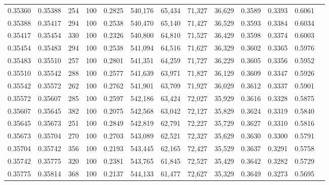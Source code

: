 \begin{tabular}{rrrrrrrrrrrrr}
0.35360 & 0.35388 &   254 & 100 &                                     0.2825 & 540,176 &  65,434 &  71,327 &  36,629 & 0.3589 & 0.3393 & 0.6061 \\
0.35388 & 0.35417 &   294 & 100 &                                     0.2538 & 540,470 &  65,140 &  71,427 &  36,529 & 0.3593 & 0.3384 & 0.6034 \\
0.35417 & 0.35454 &   330 & 100 &                                     0.2326 & 540,800 &  64,810 &  71,527 &  36,429 & 0.3598 & 0.3374 & 0.6003 \\
0.35454 & 0.35483 &   294 & 100 &                                     0.2538 & 541,094 &  64,516 &  71,627 &  36,329 & 0.3602 & 0.3365 & 0.5976 \\
0.35483 & 0.35510 &   257 & 100 &                                     0.2801 & 541,351 &  64,259 &  71,727 &  36,229 & 0.3605 & 0.3356 & 0.5952 \\
0.35510 & 0.35542 &   288 & 100 &                                     0.2577 & 541,639 &  63,971 &  71,827 &  36,129 & 0.3609 & 0.3347 & 0.5926 \\
0.35542 & 0.35572 &   262 & 100 &                                     0.2762 & 541,901 &  63,709 &  71,927 &  36,029 & 0.3612 & 0.3337 & 0.5901 \\
0.35572 & 0.35607 &   285 & 100 &                                     0.2597 & 542,186 &  63,424 &  72,027 &  35,929 & 0.3616 & 0.3328 & 0.5875 \\
0.35607 & 0.35645 &   382 & 100 &                                     0.2075 & 542,568 &  63,042 &  72,127 &  35,829 & 0.3624 & 0.3319 & 0.5840 \\
0.35645 & 0.35673 &   251 & 100 &                                     0.2849 & 542,819 &  62,791 &  72,227 &  35,729 & 0.3627 & 0.3310 & 0.5816 \\
0.35673 & 0.35704 &   270 & 100 &                                     0.2703 & 543,089 &  62,521 &  72,327 &  35,629 & 0.3630 & 0.3300 & 0.5791 \\
0.35704 & 0.35742 &   356 & 100 &                                     0.2193 & 543,445 &  62,165 &  72,427 &  35,529 & 0.3637 & 0.3291 & 0.5758 \\
0.35742 & 0.35775 &   320 & 100 &                                     0.2381 & 543,765 &  61,845 &  72,527 &  35,429 & 0.3642 & 0.3282 & 0.5729 \\
0.35775 & 0.35814 &   368 & 100 &                                     0.2137 & 544,133 &  61,477 &  72,627 &  35,329 & 0.3649 & 0.3273 & 0.5695 \\

\end{tabular}
